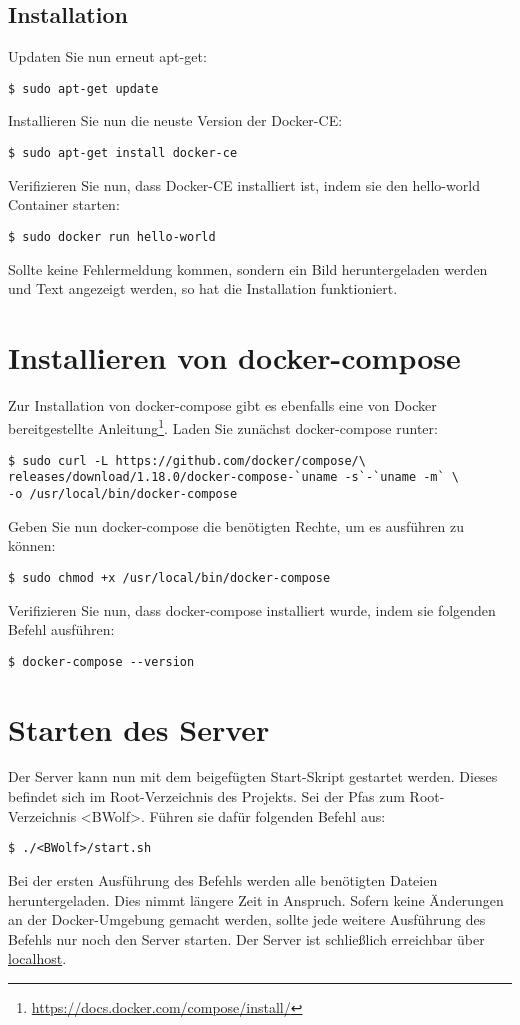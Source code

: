 			\subsection{Installation}
			Updaten Sie nun erneut apt-get:
			\begin{lstlisting}
$ sudo apt-get update
			\end{lstlisting}
			Installieren Sie nun die neuste Version der Docker-CE:
			\begin{lstlisting}
$ sudo apt-get install docker-ce
			\end{lstlisting}
			Verifizieren Sie nun, dass Docker-CE installiert ist, indem sie den hello-world Container starten:
			\begin{lstlisting}
$ sudo docker run hello-world
			\end{lstlisting}
			Sollte keine Fehlermeldung kommen, sondern ein Bild heruntergeladen werden und Text angezeigt werden, so hat die Installation funktioniert.
        
    \section{Installieren von docker-compose}
        Zur Installation von docker-compose gibt es ebenfalls eine von Docker bereitgestellte Anleitung\footnote{\href{https://docs.docker.com/compose/install/}{https://docs.docker.com/compose/install/}}.
        Laden Sie zunächst docker-compose runter:
   	    \begin{lstlisting}
$ sudo curl -L https://github.com/docker/compose/\
releases/download/1.18.0/docker-compose-`uname -s`-`uname -m` \
-o /usr/local/bin/docker-compose
	    \end{lstlisting}
        Geben Sie nun docker-compose die benötigten Rechte, um es ausführen zu können:
   	    \begin{lstlisting}
$ sudo chmod +x /usr/local/bin/docker-compose
	    \end{lstlisting}
	    Verifizieren Sie nun, dass docker-compose installiert wurde, indem sie folgenden Befehl ausführen:
	    \begin{lstlisting}
$ docker-compose --version
	    \end{lstlisting}
        
    \section{Starten des Server}
        Der Server kann nun mit dem beigefügten Start-Skript gestartet werden.
        Dieses befindet sich im Root-Verzeichnis des Projekts.
        Sei der Pfas zum Root-Verzeichnis <BWolf>.
        Führen sie dafür folgenden Befehl aus:
   	    \begin{lstlisting}
$ ./<BWolf>/start.sh
	    \end{lstlisting}
	    Bei der ersten Ausführung des Befehls werden alle benötigten Dateien heruntergeladen.
	    Dies nimmt längere Zeit in Anspruch.
        Sofern keine Änderungen an der Docker-Umgebung gemacht werden, sollte jede weitere Ausführung des Befehls nur noch den Server starten.
        Der Server ist schließlich erreichbar über \href{http://localhost}{localhost}.